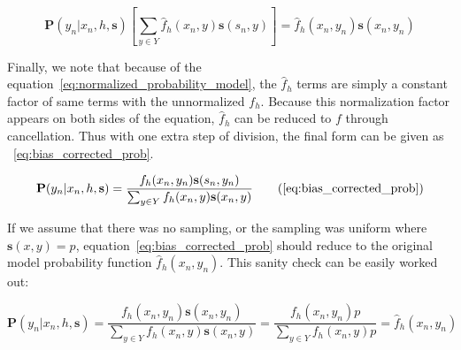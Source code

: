 \documentclass[twoside]{article}
\begin{document}
\begin{appendices}
\[\mathbf{P}(y_n|x_n,h,\mathbf{s})\left [\sum_{y \in Y}\hat{f}_h(x_n,y)\mathbf{s}(s_n,y) \right ]=\hat{f}_h(x_n,y_n)\mathbf{s}(x_n,y_n) \]

Finally, we note that because of the equation~\eqref{eq:normalized_probability_model}, the \(\hat{f}_h\) terms are simply a constant factor of same terms with the unnormalized \(f_h\). Because this normalization factor appears on both sides of the equation, \(\hat{f}_h\) can be reduced to \(f\) through cancellation. Thus with one extra step of division, the final form can be given as ~\eqref{eq:bias_corrected_prob}.

\begin{equation}
\mathbf{P}(y_n|x_n,h,\mathbf{s})=\dfrac{f_h(x_n,y_n)\mathbf{s}(s_n,y_n)}{\sum_{y \in Y}f_h(x_n,y)\mathbf{s}(x_n,y)}
\tag{\ref{eq:bias_corrected_prob}}
\end{equation}

If we assume that there was no sampling, or the sampling was uniform where \(\mathbf{s}(x,y)=p\), equation~\eqref{eq:bias_corrected_prob} should reduce to the original model probability function \(\hat{f}_h(x_n,y_n)\). This sanity check can be easily worked out:

\[\mathbf{P}(y_n|x_n,h,\mathbf{s})=\frac{f_h(x_n,y_n)\mathbf{s}(x_n,y_n)}{\sum_{y \in Y}f_h(x_n,y)\mathbf{s}(x_n,y)}=\frac{f_h(x_n,y_n)p}{\sum_{y \in Y}f_h(x_n,y)p} =\hat{f}_h(x_n,y_n)\]

\end{appendices}

\end{document}
